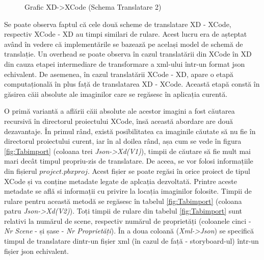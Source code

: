 \begin{figure}[!htbp]
\centering
{}
\caption{Grafic XD->XCode (Schema Translatare 2)} \label{fig:Grafic1}
\end{figure}

Se poate observa faptul că cele două scheme de translatare XD - XCode, respectiv XCode - XD au timpi similari de rulare. Acest lucru era de așteptat având în vedere că implementările se bazează pe același model de schemă de translație. Un overhead se poate observa în cazul translatării din XCode în XD din cauza etapei intermediare de transformare a xml-ului într-un format json echivalent. De asemenea, în cazul translatării XCode - XD, apare o etapă computațională în plus față de translatarea XD - XCode. Această etapă constă în găsirea căii absolute ale imaginilor care se regăsesc în aplicația curentă. 

O primă variantă a aflării căii absolute ale acestor imagini a fost căutarea recursivă în directorul proiectului XCode, însă această abordare are două dezavantaje. În primul rând, există posibilitatea ca imaginile căutate să nu fie în directorul proiectului curent, iar în al doilea rând, așa cum se vede în figura \ref{fig:Tabimport} (coloana trei \textit{Json->Xd(V1)}), timpii de căutare să fie mult mai mari decât timpul propriu-zis de translatare. De aceea, se vor folosi informațiile din fișierul $project.pbxproj$. Acest fișier se poate regăsi în orice proiect de tipul XCode și va conține metadate legate de aplcația dezvoltată. Printre aceste metadate se află si informații cu privire la locația imaginilor folosite. Timpii de rulare pentru această metodă se regăsesc în tabelul \ref{fig:Tabimport} (coloana patru \textit{Json->Xd(V2)}). Toți timpii de rulare din tabelul \ref{fig:Tabimport} sunt relativi la numărul de scene, respectiv numărul de proprietăți (coloanele cinci - \textit{Nr Scene} - și șase - \textit{Nr Proprietăți}). În a doua coloană (\textit{Xml->Json}) se specifică timpul de translatare dintr-un fișier xml (în cazul de față - storyboard-ul) într-un fișier json echivalent.

